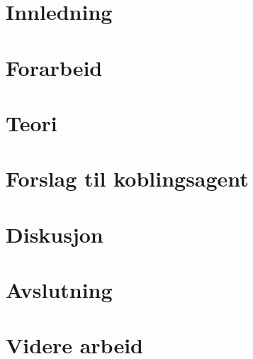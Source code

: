 \documentclass[11pt,norsk,a4paper]{report}
\begin{document}


\newpage

\newpage

\newpage


\newpage
\tableofcontents
\listoftables
\listoffigures
\newpage
{}
\chapter{Innledning}


\chapter{Forarbeid}
\label{chapter:forarbeid}


\chapter{Teori}
\label{chapter:teori}


\chapter{Forslag til koblingsagent}
\label{chapter:forslag}


\chapter{Diskusjon}
\label{chapter:diskusjon}


\chapter{Avslutning}
\label{chapter:konklusjon}


\chapter{Videre arbeid}
\label{chapter:viderearbeid}


\newpage



\end{document}
